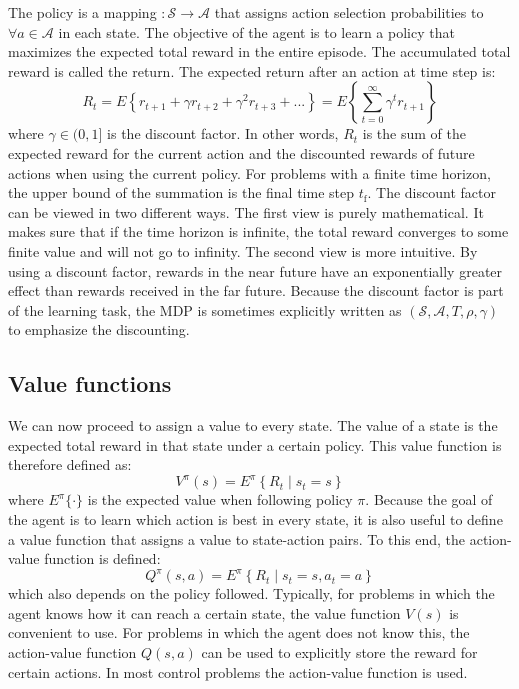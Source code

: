 The policy is a mapping $ : \mathcal{S} \rightarrow \mathcal{A}$ that assigns action selection probabilities to $\forall a \in \mathcal{A}$ in each state. The objective of the agent is to learn a policy that maximizes the expected total reward in the entire episode. The accumulated total reward is called the return. The expected return  after an action at time step  is:
$$%
	R_t = E\left\{ r_{t+1} + \gamma r_{t+2} + \gamma^2 r_{t+3} + ...\right\} = E\left\{ \sum_{t=0}^\infty\gamma^t r_{t+1} \right\}  
$$%
where $\gamma\in (0,1]$ is the discount factor. In other words, $R_t$ is the sum of the expected reward for the current action and the discounted rewards of future actions when using the current policy. For problems with a finite time horizon, the upper bound of the summation is the final time step $t_\mathrm{f}$. The discount factor can be viewed in two different ways. The first view is purely mathematical. It makes sure that if the time horizon is infinite, the total reward converges to some finite value and will not go to infinity. The second view is more intuitive. By using a discount factor, rewards in the near future have an exponentially greater effect than rewards received in the far future. Because the discount factor is part of the learning task, the \ac{MDP} is sometimes explicitly written as $(\mathcal{S},\mathcal{A},T,\rho,\gamma)$ to emphasize the discounting. 

\subsection{Value functions}\label{sec:RL-Value_functions}
We can now proceed to assign a value to every state. The value of a state  is the expected total reward in that state under a certain policy. This value function is therefore defined as:
$$%
	V^\pi(s)=E^\pi \left\{ R_t \mid s_t=s  \right\}
$$%
where $E^\pi\{\cdot\}$ is the expected value when following policy $\pi$. Because the goal of the agent is to learn which action is best in every state, it is also useful to define a value function that assigns a value to state-action pairs. To this end, the action-value function  is defined:
$$%
	Q^\pi(s,a)=E^\pi \left\{ R_t \mid s_t=s,a_t=a \right\}
$$%
which also depends on the policy followed. Typically, for problems in which the agent knows how it can reach a certain state, the value function $V(s)$ is convenient to use. For problems in which the agent does not know this, the action-value function $Q(s,a)$ can be used to explicitly store the reward for certain actions. In most control problems the action-value function is used.



